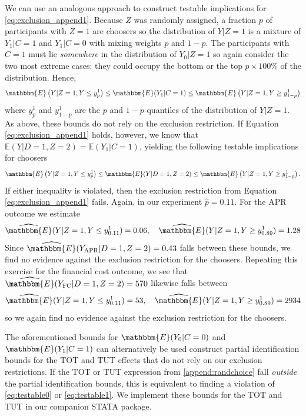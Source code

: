 We can use an analogous approach to construct testable implications for \ref{eq:exclusion_append1}. 
Because $Z$ was randomly assigned, a fraction $p$ of participants with $Z = 1$ are choosers so the distribution of $Y|Z=1$ is a mixture of $Y_1|C=1$ and $Y_1|C=0$ with mixing weights $p$ and $1 -p$.
The participants with $C = 1$ must lie \emph{somewhere} in the distribution of $Y_0|Z=1$ so again consider the two most extreme cases: they could occupy the bottom or the top $p\times 100\%$ of the distribution. 
Hence,
\[
\mathbbm{E}\left(Y|Z=1,Y\leq y^1_{p}\right) \leq \mathbbm{E}(Y_1|C=1) \leq \mathbbm{E}\left(Y|Z=1,Y \geq y^1_{1-p}\right)
\]
where $y^1_p$ and $y^1_{1-p}$ are the $p$ and $1 - p$ quantiles of the distribution of $Y|Z=1$.
As above, these bounds do not rely on the exclusion restriction.
If Equation \ref{eq:exclusion_append1} holds, however, we know that $\mathbb{E}(Y|D=1,Z=2) = \mathbb{E}(Y_1|C=1)$, yielding the following testable implications for choosers
\begin{equation}
\mathbbm{E}\left(Y|Z=1,Y\leq y^1_{p}\right) \leq \mathbbm{E}(Y|D=1,Z=2) \leq \mathbbm{E}\left(Y|Z=1,Y \geq y^1_{1-p}\right).
\label{eq:testable1}
\end{equation}
If either inequality is violated, then the exclusion restriction from Equation \ref{eq:exclusion_append1} fails.
Again, in our experiment $\widehat{p}=0.11$. For the APR outcome we estimate
\[
\widehat{\mathbbm{E}}(Y|Z=1,Y\leq y^1_{0.11}) = 0.06, \quad
\widehat{\mathbbm{E}}(Y|Z=1,Y\geq y^1_{0.89}) = 1.28
\]
Since $\widehat{\mathbbm{E}}(Y_\text{APR}|D=1,Z=2) = 0.43$ falls between these bounds, we find no evidence against the exclusion restriction for the choosers. 
Repeating this exercise for the financial cost outcome, we see  that $\widehat{\mathbbm{E}}(Y_\text{FC}|D=1,Z=2)= 570$ likewise falls between
\[
\widehat{\mathbbm{E}}(Y|Z=1,Y\leq y^1_{0.11}) = 53, \quad
\widehat{\mathbbm{E}}(Y|Z=1,Y\geq y^1_{0.89}) = 2934
\]
so we again find no evidence against the exclusion restriction for the choosers.

The aforementioned bounds for $\mathbbm{E}(Y_0|C=0)$ and $\mathbbm{E}(Y_1|C=1)$ can alternatively be used construct partial identification bounds for the TOT and TUT effects that do not rely on our exclusion restrictions. If the TOT or TUT expression from \ref{append:randchoice} fall \emph{outside} the partial identification bounds, this is equivalent to finding a violation of \ref{eq:testable0} or \ref{eq:testable1}. We implement these bounds for the TOT and TUT in our companion STATA package.




